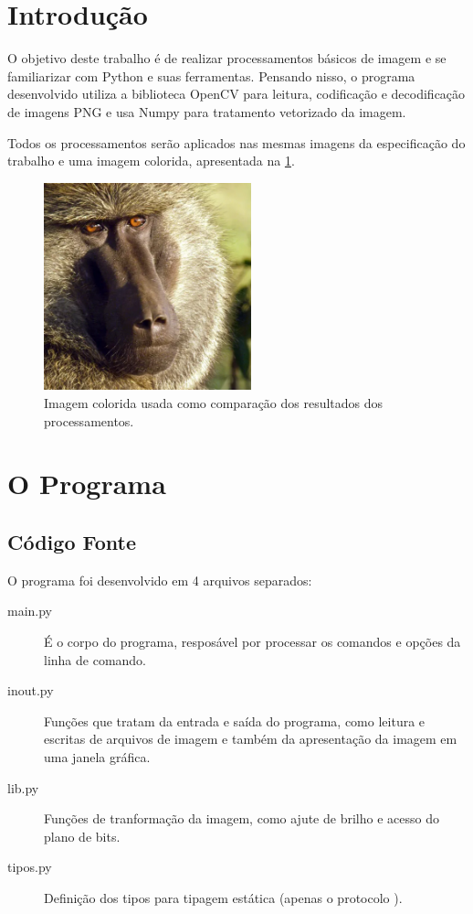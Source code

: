 \documentclass[assignment = 0]{homework}
\begin{document}
    \section{Introdução}

    O objetivo deste trabalho é de realizar processamentos básicos de imagem e se familiarizar com Python e suas ferramentas. Pensando nisso, o programa desenvolvido utiliza a biblioteca OpenCV para leitura, codificação e decodificação de imagens PNG e usa Numpy para tratamento vetorizado da imagem.

    Todos os processamentos serão aplicados nas mesmas imagens da especificação do trabalho e uma imagem colorida, apresentada na \cref{fig:color}.

    \begin{figure}[H]
        \centering
        \includegraphics[width=6cm]{imagens/color.png}

        \caption{Imagem colorida usada como comparação dos resultados dos processamentos.}
        \label{fig:color}
    \end{figure}

    \section{O Programa}

    \subsection{Código Fonte}

    O programa foi desenvolvido em 4 arquivos separados:

    \begin{description}
        \item[main.py] É o corpo do programa, resposável por processar os comandos e opções da linha de comando.

        \item[inout.py] Funções que tratam da entrada e saída do programa, como leitura e escritas de arquivos de imagem e também da apresentação da imagem em uma janela gráfica.

        \item[lib.py] Funções de tranformação da imagem, como ajute de brilho e acesso do plano de bits.

        \item[tipos.py] Definição dos tipos para tipagem estática (apenas o protocolo \autocite{ref:pep544} ).
    \end{description}
\end{document}
